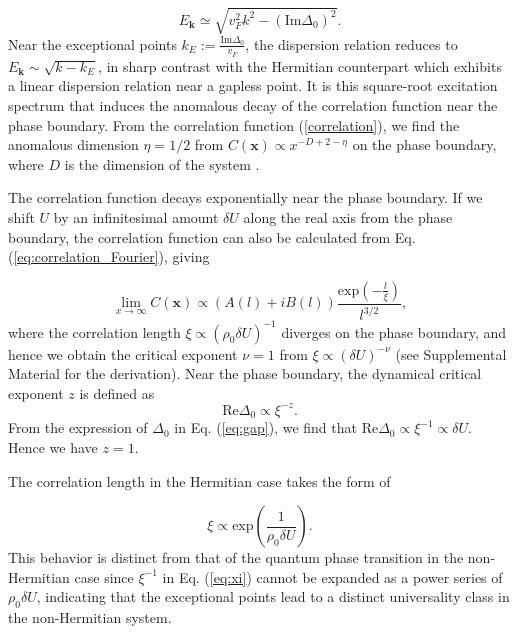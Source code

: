 \documentclass[aps,prl,twocolumn,superscriptaddress]{revtex4-1}
\begin{document}
\begin{equation}
E_{\bm{k}}\simeq\sqrt{v_{F}^{2}k^{2}-(\text{Im}\Delta_0)^{2}}.
\end{equation}
Near the exceptional points $k_{E}:=\frac{\text{Im}\Delta_0}{v_{F}}$,
the dispersion relation reduces to $E_{\bm{k}}\sim\sqrt{k-k_{E}}$,
in sharp contrast with the Hermitian counterpart which exhibits 
a linear dispersion relation near a gapless point. It is this square-root
excitation spectrum that induces the anomalous decay of the correlation
function near the phase boundary. From the correlation function (\ref{correlation}),
we find the anomalous dimension $\eta=1/2$ from $C(\bm{x})\propto x^{-D+2-\eta}$
on the phase boundary, where $D$ is the dimension of the system \cite{Sachdev:2011uj}.

The correlation function decays exponentially near the phase boundary.
If we shift $U$ by an infinitesimal amount $\delta U$ along the
real axis from the phase boundary, the correlation function can also
be calculated from Eq. (\ref{eq:correlation_Fourier}), giving

\begin{equation}
\lim_{x\rightarrow\infty}C(\bm{x})\propto(A(l)+iB(l))\frac{\text{exp}\left(-\frac{l}{\xi}\right)}{l^{3/2}},\label{eq:exponential_decay}
\end{equation}
where the correlation length $\xi\propto(\rho_{0}\delta U)^{-1}$
diverges on the phase boundary, and hence we obtain the critical exponent
$\nu=1$ from $\xi\propto(\delta U)^{-\nu}$ \cite{Sachdev:2011uj}
(see Supplemental Material \cite{SupplementaryMaterial} for the
derivation). Near the phase boundary, the dynamical critical exponent
$z$ is defined as 
\begin{equation}
\text{Re}\Delta_0\propto\xi^{-z}.
\end{equation}
From the expression of $\Delta_0$ in Eq. (\ref{eq:gap}), we find
that $\text{Re}\Delta_0\propto\xi^{-1}\propto\delta U$. Hence 
we have $z=1$.

The correlation length in the Hermitian case takes the
form of

\begin{equation}
\xi\propto\text{exp}\left(\frac{1}{\rho_{0}\delta U}\right).\label{eq:xi}
\end{equation}
This behavior is distinct from that of the quantum phase transition
in the non-Hermitian case since $\xi^{-1}$ in Eq. (\ref{eq:xi})
cannot be expanded as a power series of $\rho_{0}\delta U$, indicating that the exceptional points lead to a distinct 
universality class in the non-Hermitian system.
\end{document}
